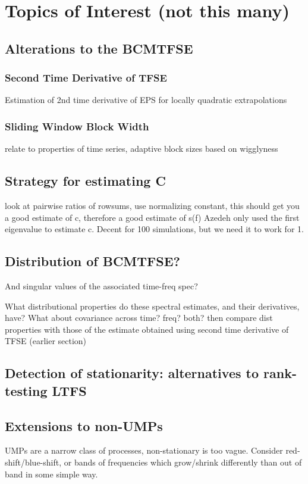 \chapter{Topics of Interest (not this many)} \label{chap:chap3}

\section{Alterations to the BCMTFSE}
\subsection{Second Time Derivative of TFSE}
Estimation of 2nd time derivative of EPS for locally quadratic extrapolations
\subsection{Sliding Window Block Width}
relate to properties of time series, adaptive block sizes based on wigglyness

\section{Strategy for estimating C}
look at pairwise ratios of rowsums, use normalizing constant, this should get you a good estimate of c, therefore a good estimate of s(f) Azedeh only used the first eigenvalue to estimate c. Decent for 100 simulations, but we need it to work for 1.

\section{Distribution of BCMTFSE?}
And singular values of the associated time-freq spec?

What distributional properties do these spectral estimates, and their derivatives, have? What about covariance across time? freq? both? then compare dist properties with those of the estimate obtained using second time derivative of TFSE (earlier section)

\section{Detection of stationarity: alternatives to rank-testing LTFS}

\section{Extensions to non-UMPs}

UMPs are a narrow class of processes, non-stationary is too vague. Consider red-shift/blue-shift, or bands of frequencies which grow/shrink differently than out of band in some simple way.